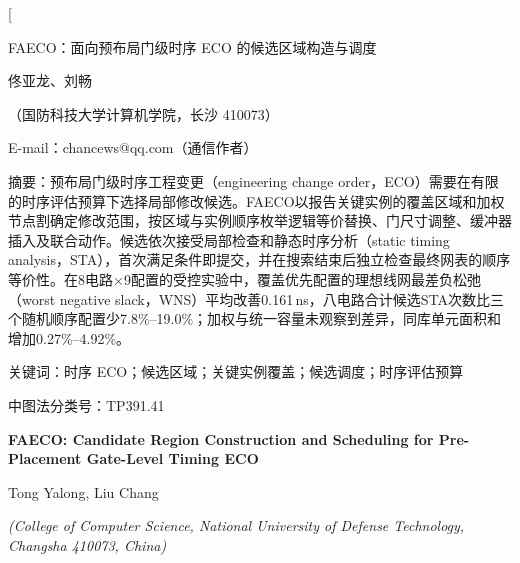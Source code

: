 \documentclass[twocolumn,10pt,fontset=windows]{ctexart}
\let\songti\songfamily\let\heiti\heifamily\let\fangsong\fangfamily
\begin{document}
\pagestyle{plain}

\twocolumn[
\vspace*{-0.25cm}
\begin{center}
{\heiti{} FAECO：面向预布局门级时序 ECO 的候选区域构造与调度}\par
\vspace{6pt}
{\fangsong{} 佟亚龙、刘畅}\par
\vspace{4pt}
{\songti\fontsize{8}{12}\selectfont（国防科技大学计算机学院，长沙 410073）}\par\vspace{2pt}
{\songti\fontsize{8}{12}\selectfont E-mail：chancews@qq.com（通信作者）}\par
\vspace{6pt}
\end{center}
\begin{flushleft}
  {\heiti\fontsize{8.5}{13}\selectfont 摘\quad 要：}{\songti\fontsize{8.5}{13}\selectfont 预布局门级时序工程变更（engineering change order，ECO）需要在有限的时序评估预算下选择局部修改候选。FAECO以报告关键实例的覆盖区域和加权节点割确定修改范围，按区域与实例顺序枚举逻辑等价替换、门尺寸调整、缓冲器插入及联合动作。候选依次接受局部检查和静态时序分析（static timing analysis，STA），首次满足条件即提交，并在搜索结束后独立检查最终网表的顺序等价性。在8电路$\times$9配置的受控实验中，覆盖优先配置的理想线网最差负松弛（worst negative slack，WNS）平均改善0.161\,ns，八电路合计候选STA次数比三个随机顺序配置少7.8\%--19.0\%；加权与统一容量未观察到差异，同库单元面积和增加0.27\%--4.92\%。}
\par
\vspace{4pt}
{\heiti\fontsize{8.5}{13}\selectfont 关键词：}{\songti\fontsize{8.5}{13}\selectfont 时序 ECO；候选区域；关键实例覆盖；候选调度；时序评估预算}\par
\vspace{2pt}
{\songti\fontsize{8.5}{13}\selectfont 中图法分类号：TP391.41}\par
\vspace{3pt}
\end{flushleft}
\vspace{2pt}
\begin{center}
{\bfseries\fontsize{12.5}{16}\selectfont FAECO: Candidate Region Construction and Scheduling for Pre-Placement Gate-Level Timing ECO}\par
\vspace{3pt}
{\normalsize Tong Yalong, Liu Chang\par}
\vspace{3pt}
{\small \itshape (College of Computer Science, National University of Defense Technology, Changsha 410073, China)}\par
\vspace{4pt}
\end{center}
\end{document}
